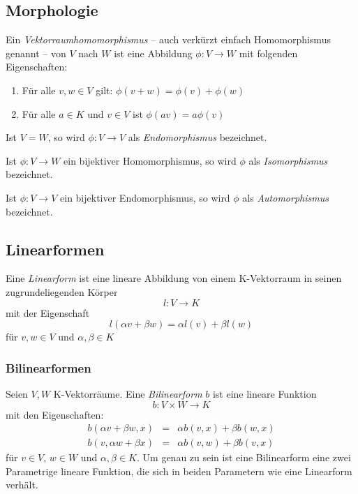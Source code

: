 \subsection{Morphologie}

\begin{definition}

Ein \textsl{Vektorraumhomomorphismus} -- auch verkürzt einfach Homomorphismus genannt -- von $V$ nach $W$ ist eine Abbildung $\phi : V \longrightarrow W$ mit folgenden Eigenschaften:
\begin{enumerate}
\item Für alle $v,w \in V$ gilt: $\phi(v+w) = \phi(v)+\phi(w)$
\item Für alle $a\in K$ und $v\in V$ ist $\phi(av)=a\phi(v)$
\end{enumerate}
Ist $V=W$, so wird $\phi : V\longrightarrow V$ als \textsl{Endomorphismus} bezeichnet.
\end{definition}

\begin{definition}
Ist $\phi : V\longrightarrow W$ ein bijektiver Homomorphismus, so wird $\phi$ als \textsl{Isomorphismus} bezeichnet.
\end{definition}

\begin{definition}
Ist $\phi : V\longrightarrow V$ ein bijektiver Endomorphismus,  so wird $\phi$ als \textsl{Automorphismus} bezeichnet.
\end{definition}

\subsection{Linearformen}

\begin{definition}
Eine \textsl{Linearform}  ist eine lineare Abbildung von einem K-Vektorraum in seinen zugrundeliegenden Körper
\[
l : V \longrightarrow K
\]
mit der Eigenschaft
\[l(\alpha v + \beta w) = \alpha l(v) + \beta l(w) \]
für $v,w\in V$ und $\alpha, \beta \in K$
\end{definition}

\subsubsection{Bilinearformen}

\begin{definition}
Seien $V,W$ K-Vektorräume. Eine \textsl{Bilinearform} $b$ ist eine lineare Funktion
\[
	b : V \times W \longrightarrow K
\]
mit den Eigenschaften:
\begin{eqnarray*}
b(\alpha v + \beta w,x) &=& \alpha b(v,x) + \beta b(w,x) \\
b(v,\alpha w + \beta x) &=& \alpha b(v,w) + \beta b(v,x) 
\end{eqnarray*}
für $v\in V$, $w\in W$ und $\alpha, \beta \in K$. Um genau zu sein ist eine Bilinearform eine zwei Parametrige lineare Funktion, die sich in beiden Parametern wie eine Linearform verhält.
\end{definition}

